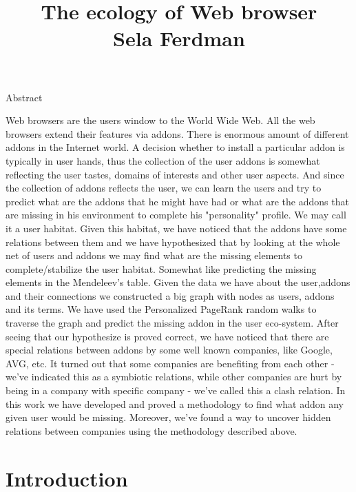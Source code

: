 \documentclass[11pt,oneside]{book}
\begin{document}
\newpage
\tableofcontents
\newpage

\begin{center}
\title{\huge{
 The ecology of Web browser
\\[5mm]  Sela Ferdman\\
}}
\LARGE{Abstract}
\end{center}

Web browsers are the users window to the World Wide Web. All the web browsers extend their features via addons. There is enormous amount of different addons in the Internet world. A decision whether to install a particular addon is typically in user hands, thus the collection of the user addons is somewhat reflecting the user tastes, domains of interests and other user aspects. And since the collection of addons reflects the user, we can learn the users and try to predict what are the addons that he might have had or what are the addons that are missing in his environment to complete his "personality" profile.
We may call it a user habitat. Given this habitat, we have noticed that the addons have some relations between them and we have hypothesized that by looking at the whole net of users and addons we may find what are the missing elements to complete/stabilize the user habitat. Somewhat like predicting the missing elements in the Mendeleev's table.
Given the data we have about the user,addons and their connections we constructed a big graph with nodes as users, addons and its terms. We have used the Personalized PageRank random walks to traverse the graph and predict the missing addon in the user eco-system. After seeing that our hypothesize is proved correct, we have noticed that there are special relations between addons by some well known companies, like Google, AVG, etc. It turned out that some companies are benefiting from each other - we've indicated this as a symbiotic relations, while other companies are hurt by being in a company with specific company - we've called this a clash relation.
In this work we have developed and proved a methodology to find what addon any given user would be missing. Moreover, we've found a way to uncover hidden relations between companies using the methodology described above.

\listoffigures
{}
\listoftables
{}


\chapter{Introduction}
\end{document}

